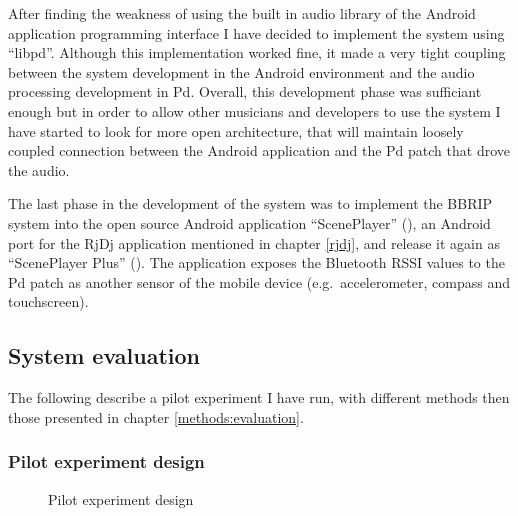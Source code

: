 \documentclass[a4paper,11pt]{article}
\begin{document}
{After finding the weakness of using the built in audio library of the Android application programming interface I have decided to implement the system using ``libpd''.
Although this implementation worked fine, it made a very tight coupling between the system development in the Android environment and the audio processing development in Pd.
Overall, this development phase was sufficiant enough but in order to allow other musicians and developers to use the system I have started to look for more open architecture, that will maintain loosely coupled connection between the Android application and the Pd patch that drove the audio.

The last phase in the development of the system was to implement the BBRIP system into the open source Android application ``ScenePlayer'' (\cite{web:sceneplayer}), an Android port for the RjDj application mentioned in chapter \ref{rjdj}, and release it again as ``ScenePlayer Plus'' (\cite{web:sceneplayerplus}).
The application exposes the Bluetooth RSSI values to the Pd patch as another sensor of the mobile device (e.g.\ accelerometer, compass and touchscreen).

\subsection{System evaluation}

The following describe a pilot experiment I have run, with different methods then those presented in chapter \ref{methods:evaluation}.

\subsubsection{Pilot experiment design}

\begin{figure}[!htb]
	\centering
	\def\svgwidth{0.95\columnwidth}
  	
	\caption{Pilot experiment design}\label{fig:pilot}
\end{figure}

}
\end{document}
